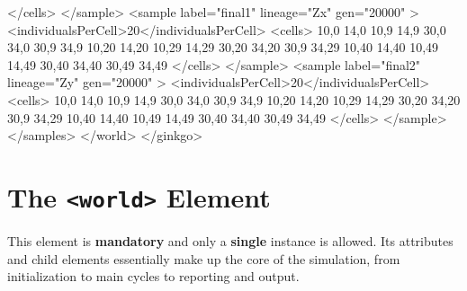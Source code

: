 \documentclass[11pt]{article}
\newcommand{\xmlelem}[1]{{\tt<\textcolor{xmlelem}{#1}>}}
\begin{document}
\begin{ginkgoxml}
                </cells>
            </sample>
            <sample label="final1" lineage="Zx" gen="20000" >
                <individualsPerCell>20</individualsPerCell>
                <cells>
                    10,0  14,0   10,9   14,9     30,0  34,0  30,9  34,9
                    10,20 14,20  10,29  14,29    30,20 34,20 30,9  34,29
                    10,40 14,40  10,49  14,49    30,40 34,40 30,49 34,49
                </cells>
            </sample>
            <sample label="final2" lineage="Zy" gen="20000" >
                <individualsPerCell>20</individualsPerCell>
                <cells>
                    10,0  14,0   10,9   14,9     30,0  34,0  30,9  34,9
                    10,20 14,20  10,29  14,29    30,20 34,20 30,9  34,29
                    10,40 14,40  10,49  14,49    30,40 34,40 30,49 34,49
                </cells>
            </sample>
        </samples>
    </world>
</ginkgo>
\end{ginkgoxml}



\section{The \xmlelem{world} Element}

This element is \textbf{mandatory} and only a \textbf{single} instance is allowed.
Its attributes and child elements essentially make up the core of the simulation, from initialization to main cycles to reporting and output.
\end{document}
